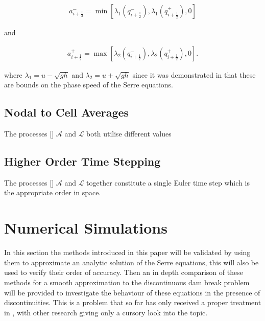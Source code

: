\documentclass[SingleSpace,12pt,Proceedings]{Serre_ASCE}
\begin{document}
\begin{linenomath*}
\begin{gather*}
a^-_{i+\frac{1}{2}} = \min \left[\lambda_1\left(q^-_{i + \frac{1}{2}}\right), \lambda_1\left(q^+_{i + \frac{1}{2}}\right), 0 \right]
\end{gather*}
\end{linenomath*}
and
\begin{linenomath*}
\begin{gather*}
a^+_{i+\frac{1}{2}} = \max \left[\lambda_2\left(q^-_{i + \frac{1}{2}}\right), \lambda_2\left(q^+_{i + \frac{1}{2}}\right), 0 \right].
\end{gather*}
\end{linenomath*}
where $\lambda_1 = u - \sqrt{gh}$ and $\lambda_2 = u + \sqrt{gh}$ since it was demonstrated in  that these are bounds on the phase speed of the Serre equations.
\subsection{Nodal to Cell Averages}
The processes [] $\mathcal{A}$ and $\mathcal{L}$ both utilise different values


\subsection{Higher Order Time Stepping}
The processes [] $\mathcal{A}$ and $\mathcal{L}$ together constitute a single Euler time step which is the appropriate order in space.

\section{Numerical Simulations}
\label{section:Numerical Simulations}
In this section the methods introduced in this paper will be validated by using them to approximate an analytic solution of the Serre equations, this will also be used to verify their order of accuracy. Then an in depth comparison of these methods for a smooth approximation to the discontinuous dam break problem will be provided to investigate the behaviour of these equations in the presence of discontinuities. This is a problem that so far has only received a proper treatment in \cite{El-etal-2006}, with other research giving only a cursory look into the topic. 

\end{document}
